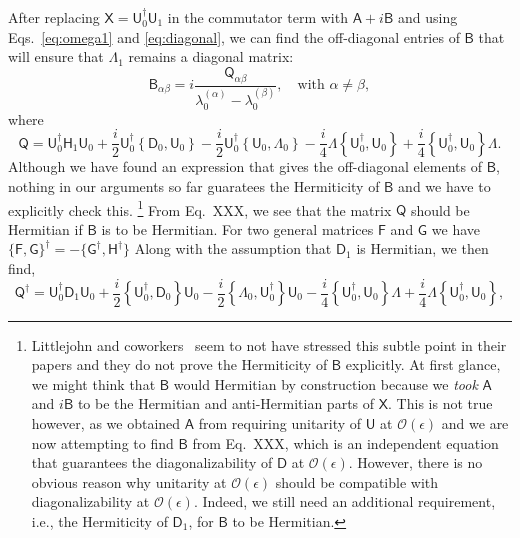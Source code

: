 After replacing $\mathsf{X} = \mathsf{U}_{0}^{\dagger}\mathsf{U}_{1}$ in the commutator term with $\mathsf{A} + i\mathsf{B}$ and using Eqs.~\eqref{eq:omega1} and \eqref{eq:diagonal}, we can find the off-diagonal entries of $\mathsf{B}$ that will ensure that $\Lambda_{1}$ remains a diagonal matrix:
%
\begin{equation}
  \mathsf{B}_{\alpha\beta} = i\frac{\mathsf{Q}_{\alpha\beta}}{\lambda_{0}^{(\alpha)} - \lambda_{0}^{(\beta)}},
  \quad \text{with }\alpha \neq \beta,
\end{equation}
%
where
%
\begin{equation}
  \mathsf{Q} = \mathsf{U}_{0}^{\dagger}\mathsf{H}_{1}\mathsf{U}_{0} + \frac{i}{2}\mathsf{U}_{0}^{\dagger}\left\{\mathsf{D}_{0},\mathsf{U}_{0}\right\} - \frac{i}{2}\mathsf{U}_{0}^{\dagger}\left\{\mathsf{U}_{0},\Lambda_{0}\right\}
  -\frac{i}{4}\Lambda\left\{\mathsf{U}_{0}^{\dagger}, \mathsf{U}_{0}\right\} +
  \frac{i}{4}\left\{\mathsf{U}_{0}^{\dagger}, \mathsf{U}_{0}\right\}\Lambda.
\end{equation}
%
Although we have found an expression that gives the off-diagonal elements of $\mathsf{B}$, nothing in our arguments so far guaratees the Hermiticity of $\mathsf{B}$ and we have to explicitly check this.%
\footnote{Littlejohn and coworkers~\cite{littlejohn1991,weigert1993} seem to not have stressed this subtle point in their papers and they do not prove the Hermiticity of $\mathsf{B}$ explicitly.
  At first glance, we might think that $\mathsf{B}$ would Hermitian by construction because we \emph{took} $\mathsf{\mathsf{A}}$ and $i\mathsf{B}$ to be the Hermitian and anti-Hermitian parts of $\mathsf{X}$.
  This is not true however, as we obtained $\mathsf{A}$ from requiring unitarity of $\mathsf{U}$ at $\mathcal{O}(\epsilon)$ and we are now attempting to find $\mathsf{B}$ from Eq.~XXX, which is an independent equation that guarantees the diagonalizability of $\mathsf{D}$ at $\mathcal{O}(\epsilon)$.
  However, there is no obvious reason why unitarity at $\mathcal{O}(\epsilon)$ should be compatible with diagonalizability at $\mathcal{O}(\epsilon)$.
  Indeed, we still need an additional requirement, i.e., the Hermiticity of $\mathsf{D}_{1}$, for $\mathsf{B}$ to be Hermitian.
}
From Eq.~XXX, we see that the matrix $\mathsf{Q}$ should be Hermitian if $\mathsf{B}$ is to be Hermitian.
For two general matrices $\mathsf{F}$ and $\mathsf{G}$ we have $\{\mathsf{F},\mathsf{G}\}^{\dagger} = -\{\mathsf{G}^{\dagger},\mathsf{H}^{\dagger}\}$
Along with the assumption that $\mathsf{D}_{1}$ is Hermitian, we then find,
%
\begin{equation}
  \mathsf{Q}^{\dagger} =  \mathsf{U}_{0}^{\dagger}\mathsf{D}_{1}\mathsf{U}_{0} + \frac{i}{2}\left\{\mathsf{U}_{0}^{\dagger},   \mathsf{D}_{0}\right\}\mathsf{U}_{0} - \frac{i}{2}\left\{\Lambda_{0}, \mathsf{U}_{0}^{\dagger}\right\}\mathsf{U}_{0}
  - \frac{i}{4}\left\{\mathsf{U}_{0}^{\dagger}, \mathsf{U}_{0}\right\}\Lambda
  + \frac{i}{4}\Lambda\left\{\mathsf{U}_{0}^{\dagger}, \mathsf{U}_{0}\right\},
\end{equation}
